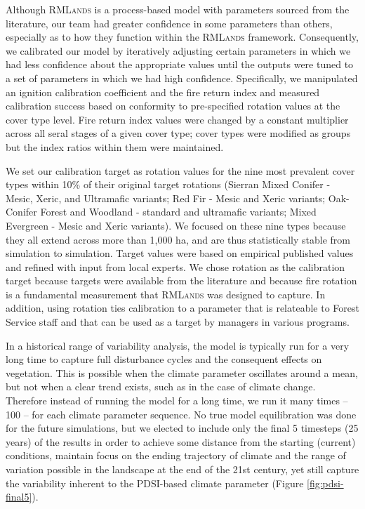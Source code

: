 \documentclass[12pt]{article}
\begin{document}
\begin{spacing}{1}
Although \textsc{RMLands} is a process-based model with parameters sourced from the literature, our team had greater confidence in some parameters than others, especially as to how they function within the \textsc{RMLands} framework. Consequently, we calibrated our model by iteratively adjusting certain parameters in which we had less confidence about the appropriate values until the outputs were tuned to a set of parameters in which we had high confidence. Specifically, we manipulated an ignition calibration coefficient and the fire return index and measured calibration success based on conformity to pre-specified rotation values at the cover type level. Fire return index values were changed by a constant multiplier across all seral stages of a given cover type; cover types were modified as groups but the index ratios within them were maintained. 

We set our calibration target as rotation values for the nine most prevalent cover types within 10\% of their original target rotations (Sierran Mixed Conifer - Mesic, Xeric, and Ultramafic variants; Red Fir - Mesic and Xeric variants; Oak-Conifer Forest and Woodland - standard and ultramafic variants; Mixed Evergreen - Mesic and Xeric variants). We focused on these nine types because they all extend across more than 1,000 ha, and are thus statistically stable from simulation to simulation. Target values were based on empirical published values and refined with input from local experts. We chose rotation as the calibration target because targets were available from the literature and because fire rotation is a fundamental measurement that \textsc{RMLands} was designed to capture. In addition, using rotation ties calibration to a parameter that is relateable to Forest Service staff and that can be used as a target by managers in various programs. 

In a historical range of variability analysis, the model is typically run for a very long time to capture full disturbance cycles and the consequent effects on vegetation. This is possible when the climate parameter oscillates around a mean, but not when a clear trend exists, such as in the case of climate change. Therefore instead of running the model for a long time, we run it many times -- 100 -- for each climate parameter sequence. No true model equilibration was done for the future simulations, but we elected to include only the final 5 timesteps (25 years) of the results in order to achieve some distance from the starting (current) conditions, maintain focus on the ending trajectory of climate and the range of variation possible in the landscape at the end of the 21st century, yet still capture the variability inherent to the PDSI-based climate parameter (Figure \ref{fig:pdsi-final5}).


\end{spacing}
\end{document}
